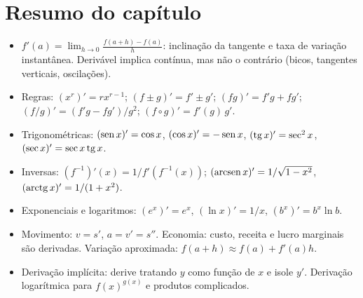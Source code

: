 \section*{Resumo do capítulo}
\begin{itemize}
\item $f'(a)=\lim_{h\to0}\frac{f(a+h)-f(a)}h$: inclinação da tangente e taxa de variação
  instantânea. Derivável implica contínua, mas não o contrário (bicos, tangentes verticais,
  oscilações).
\item Regras: $(x^r)'=rx^{r-1}$; $(f\pm g)'=f'\pm g'$; $(fg)'=f'g+fg'$;
  $(f/g)'=(f'g-fg')/g^2$; $(f\circ g)'=f'(g)\,g'$.
\item Trigonométricas: $(\operatorname{sen} x)'=\cos x$, $(\cos x)'=-\operatorname{sen} x$, $(\operatorname{tg} x)'=\sec^2x$,
  $(\sec x)'=\sec x\operatorname{tg} x$.
\item Inversas: $(f^{-1})'(x)=1/f'(f^{-1}(x))$; $(\operatorname{arcsen} x)'=1/\sqrt{1-x^2}$,
  $(\operatorname{arctg} x)'=1/(1+x^2)$.
\item Exponenciais e logaritmos: $(e^x)'=e^x$, $(\ln x)'=1/x$, $(b^x)'=b^x\ln b$.
\item Movimento: $v=s'$, $a=v'=s''$. Economia: custo, receita e lucro marginais são
  derivadas. Variação aproximada: $f(a+h)\approx f(a)+f'(a)h$.
\item Derivação implícita: derive tratando $y$ como função de $x$ e isole $y'$.
  Derivação logarítmica para $f(x)^{g(x)}$ e produtos complicados.
\end{itemize}


